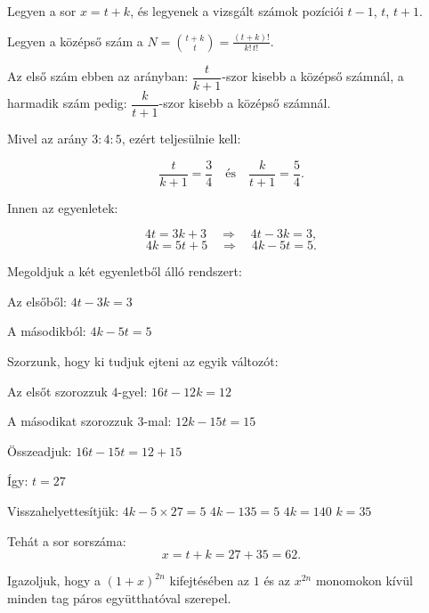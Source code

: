 \begin{solution}
Legyen a sor $x=t+k$, és legyenek a vizsgált számok pozíciói $t-1$,
$t$, $t+1$.

Legyen a középső szám a $N=\binom{t+k}{t}=\frac{(t+k)!}{k!\,t!}$.

Az első szám ebben az arányban: $\dfrac{t}{k+1}$-szor kisebb a középső
számnál, a harmadik szám pedig: $\dfrac{k}{t+1}$-szor kisebb a középső
számnál.

Mivel az arány $3:4:5$, ezért teljesülnie kell:

\[
\frac{t}{k+1}=\frac{3}{4}\quad\text{és}\quad\frac{k}{t+1}=\frac{5}{4}.
\]

Innen az egyenletek:

\[
4t=3k+3\quad\Rightarrow\quad4t-3k=3,
\]
\[
4k=5t+5\quad\Rightarrow\quad4k-5t=5.
\]

Megoldjuk a két egyenletből álló rendszert:

Az elsőből: $4t-3k=3$

A másodikból: $4k-5t=5$

Szorzunk, hogy ki tudjuk ejteni az egyik változót:

Az elsőt szorozzuk $4$-gyel: $16t-12k=12$

A másodikat szorozzuk $3$-mal: $12k-15t=15$

Összeadjuk: $16t-15t=12+15$

Így: $t=27$

Visszahelyettesítjük: $4k-5\times27=5$ $4k-135=5$ $4k=140$ $k=35$

Tehát a sor sorszáma: 
\[
x=t+k=27+35=62.
\]
\end{solution}
\begin{extraproblem}
Igazoljuk, hogy a $(1+x)^{2n}$ kifejtésében az $1$ és az $x^{2n}$
monomokon kívül minden tag páros együtthatóval szerepel.
\end{extraproblem}

